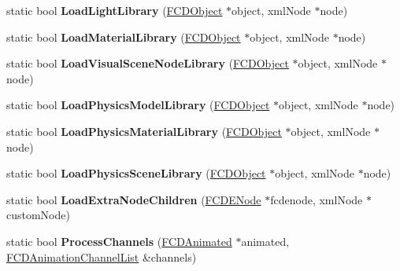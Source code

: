 \begin{DoxyCompactItemize}
\item 
\hypertarget{classFArchiveXML_a63dc58e9b11e7c7ee8be2c9a0d9ac581}{
static bool {\bfseries LoadLightLibrary} (\hyperlink{classFCDObject}{FCDObject} $\ast$object, xmlNode $\ast$node)}
\label{classFArchiveXML_a63dc58e9b11e7c7ee8be2c9a0d9ac581}

\item 
\hypertarget{classFArchiveXML_afa15aa60106cba2de98e09e237e18dd4}{
static bool {\bfseries LoadMaterialLibrary} (\hyperlink{classFCDObject}{FCDObject} $\ast$object, xmlNode $\ast$node)}
\label{classFArchiveXML_afa15aa60106cba2de98e09e237e18dd4}

\item 
\hypertarget{classFArchiveXML_ad4f1cc28aa42bb78ba85b1ca5d087a50}{
static bool {\bfseries LoadVisualSceneNodeLibrary} (\hyperlink{classFCDObject}{FCDObject} $\ast$object, xmlNode $\ast$node)}
\label{classFArchiveXML_ad4f1cc28aa42bb78ba85b1ca5d087a50}

\item 
\hypertarget{classFArchiveXML_acbc677237e097554bb960022998575e0}{
static bool {\bfseries LoadPhysicsModelLibrary} (\hyperlink{classFCDObject}{FCDObject} $\ast$object, xmlNode $\ast$node)}
\label{classFArchiveXML_acbc677237e097554bb960022998575e0}

\item 
\hypertarget{classFArchiveXML_aae3b34c0bb8bf5fba3028bfb52d03755}{
static bool {\bfseries LoadPhysicsMaterialLibrary} (\hyperlink{classFCDObject}{FCDObject} $\ast$object, xmlNode $\ast$node)}
\label{classFArchiveXML_aae3b34c0bb8bf5fba3028bfb52d03755}

\item 
\hypertarget{classFArchiveXML_a8cf7879dc4f84137474fcb012374c22d}{
static bool {\bfseries LoadPhysicsSceneLibrary} (\hyperlink{classFCDObject}{FCDObject} $\ast$object, xmlNode $\ast$node)}
\label{classFArchiveXML_a8cf7879dc4f84137474fcb012374c22d}

\item 
\hypertarget{classFArchiveXML_ad03e1e9e001d625c8438aa3a71d4d6d5}{
static bool {\bfseries LoadExtraNodeChildren} (\hyperlink{classFCDENode}{FCDENode} $\ast$fcdenode, xmlNode $\ast$customNode)}
\label{classFArchiveXML_ad03e1e9e001d625c8438aa3a71d4d6d5}

\item 
\hypertarget{classFArchiveXML_a8cec0caf19b3157792f9f1f5473110f2}{
static bool {\bfseries ProcessChannels} (\hyperlink{classFCDAnimated}{FCDAnimated} $\ast$animated, \hyperlink{classfm_1_1pvector}{FCDAnimationChannelList} \&channels)}
\label{classFArchiveXML_a8cec0caf19b3157792f9f1f5473110f2}


\end{DoxyCompactItemize}

